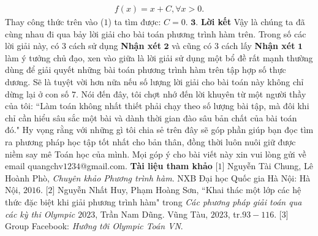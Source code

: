 \begin{multicols}{2}
	\begin{align*}
		f(x) = x + C,\forall x > 0. 
	\end{align*}
	Thay công thức trên vào ($1$) ta tìm được: $C = 0$.
	\vskip 0.1cm  
	\columnbreak
	$\pmb{3.}$	\textbf{\color{hoccungpi}Lời kết}
	\vskip 0.1cm
	Vậy là chúng ta đã cùng nhau đi qua bảy lời giải cho bài toán phương trình hàm trên. Trong số các lời giải này, có $3$ cách sử dụng \textbf{\color{hoccungpi}Nhận xét} $\pmb2$ và cũng có $3$ cách lấy \textbf{\color{hoccungpi}Nhận xét} $\pmb1$ làm ý tưởng chủ đạo, xen vào giữa là lời giải sử dụng một bổ đề rất mạnh thường dùng để giải quyết những bài toán phương trình hàm trên tập hợp số thực dương. Sẽ là tuyệt vời hơn nữa nếu số lượng lời giải cho bài toán này không chỉ dừng lại ở con số $7$.  Nói đến đây, tôi chợt nhớ đến lời khuyên từ một người thầy của tôi: ``Làm toán không nhất thiết phải chạy theo số lượng bài tập, mà đôi khi chỉ cần hiểu sâu sắc một bài và dành thời gian đào sâu bản chất của bài toán đó." Hy vọng rằng với những gì tôi chia sẻ trên đây sẽ góp phần giúp bạn đọc tìm ra phương pháp học tập tốt nhất cho bản thân, đồng thời luôn nuôi giữ được niềm say mê Toán học của mình. 
	Mọi góp ý cho bài viết này xin vui lòng gửi về email quangchv$1234$@gmail.com.
	\vskip 0.1cm
	\textbf{\color{hoccungpi}Tài liệu tham khảo}
	\vskip 0.1cm
	[$1$] Nguyễn Tài Chung, Lê Hoành Phò, \textit{Chuyên khảo Phương trình hàm}. NXB Đại học Quốc gia Hà Nội: Hà Nội, $2016$.
	\vskip 0.1cm
	[$2$] Nguyễn Nhất Huy, Phạm Hoàng Sơn, ``Khai thác một lớp các hệ thức đặc biệt khi giải phương trình hàm" trong \textit{Các phương pháp giải toán qua các kỳ thi Olympic $2023$}, Trần Nam Dũng. Vũng Tàu, $2023$, tr.$93-116$.
	\vskip 0.1cm  
	[$3$] Group Facebook: \textit{Hướng tới Olympic Toán VN}.
\end{multicols}